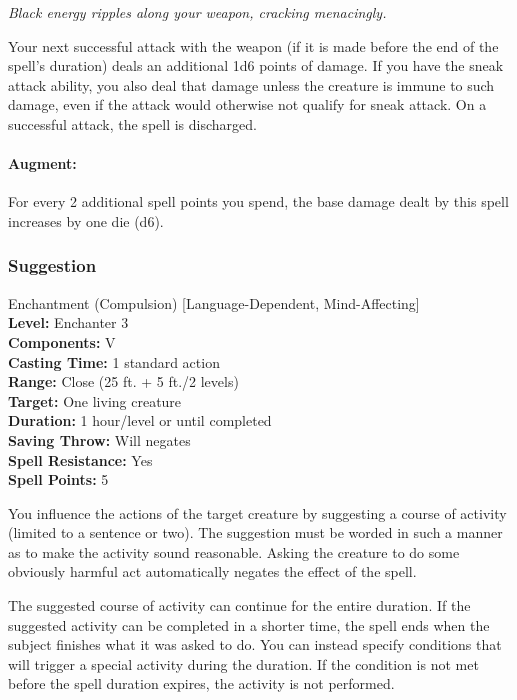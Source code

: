 \emph{Black energy ripples along your weapon, cracking menacingly.}

Your next successful attack with the weapon (if it is made before the end of the spell's duration) deals an additional 1d6 points of damage.
If you have the sneak attack ability, you also deal that damage unless the creature is immune to such damage, even if the attack would otherwise not qualify for sneak attack.
On a successful attack, the spell is discharged.

\paragraph{Augment:} For every 2 additional spell points you spend, the base damage dealt by this spell increases by one die (d6).

\subsubsection{Suggestion}
\label{Spell:Suggestion}
Enchantment (Compulsion) [Language-Dependent, Mind-Affecting]
\\ \textbf{Level:} Enchanter 3
\\ \textbf{Components:} V
\\ \textbf{Casting Time:} 1 standard action
\\ \textbf{Range:} Close (25 ft. + 5 ft./2 levels)
\\ \textbf{Target:} One living creature
\\ \textbf{Duration:} 1 hour/level or until completed
\\ \textbf{Saving Throw:} Will negates
\\ \textbf{Spell Resistance:} Yes
\\ \textbf{Spell Points:} 5

You influence the actions of the target creature by suggesting a course of activity (limited to a sentence or two). 
The suggestion must be worded in such a manner as to make the activity sound reasonable. 
Asking the creature to do some obviously harmful act automatically negates the effect of the spell.

The suggested course of activity can continue for the entire duration. 
If the suggested activity can be completed in a shorter time, the spell ends when the subject finishes what it was asked to do. 
You can instead specify conditions that will trigger a special activity during the duration. 
If the condition is not met before the spell duration expires, the activity is not performed.

